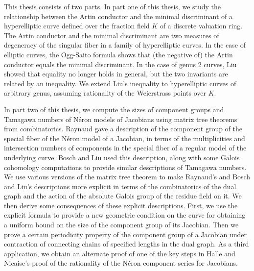 % 
% 
%
This thesis consists of two parts. In part one of this thesis, we study the relationship between the Artin conductor and the minimal discriminant of a hyperelliptic curve defined over the fraction field $K$ of a discrete valuation ring. The Artin conductor and the minimal discriminant are two measures of degeneracy of the singular fiber in a family of hyperelliptic curves. In the case of elliptic curves, the Ogg-Saito formula shows that (the negative of) the Artin conductor equals the minimal discriminant. In the case of genus $2$ curves, Liu showed that equality no longer holds in general, but the two invariants are related by an inequality. We extend Liu's inequality to hyperelliptic curves of arbitrary genus, assuming rationality of the Weierstrass points over $K$. 

In part two of this thesis, we compute the sizes of component groups and Tamagawa numbers of N\'{e}ron models of Jacobians using matrix tree theorems from combinatorics. Raynaud gave a description of the component group of the special fiber of the N\'{e}ron model of a Jacobian, in terms of the multiplicities and intersection numbers of components in the special fiber of a regular model of the underlying curve. Bosch and Liu used this description, along with some Galois cohomology computations to provide similar descriptions of Tamagawa numbers. We use various versions of the matrix tree theorem to make Raynaud's and Bosch and Liu's descriptions more explicit in terms of the combinatorics of the dual graph and the action of the absolute Galois group of the residue field on it. We then derive some consequences of these explicit descriptions. First, we use the explicit formula to provide a new geometric condition on the curve for obtaining a uniform bound on the size of the component group of its Jacobian. Then we prove a certain periodicity property of the component group of a Jacobian under contraction of connecting chains of specified lengths in the dual graph. As a third application, we obtain an alternate proof of one of the key steps in Halle and Nicaise's proof of the rationality of the N\'{e}ron component series for Jacobians. 
